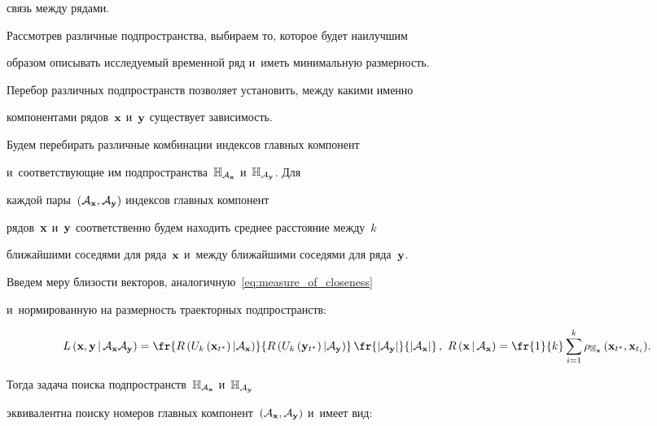 связь между рядами.



Рассмотрев различные подпространства, выбираем то, которое будет наилучшим 

образом описывать исследуемый временной ряд и~иметь минимальную размерность.  

Перебор различных подпространств позволяет установить, между какими именно 

компонентами рядов~$\mathbf{x}$ и~$\mathbf{y}$ существует зависимость.



Будем перебирать различные комбинации индексов главных компонент 

и~соответствующие им подпространства~$\mathbb{H}_{\mathcal{A}_{\mathbf{x}}}$ и~$\mathbb{H}_{\mathcal{A}_{\mathbf{y}}}$. Для 

каждой пары~$\left({\mathcal{A}}_{\mathbf{x}}, {\mathcal{A}}_{\mathbf{y}}\right)$ индексов главных компонент 

рядов~$\mathbf{x}$ и~$\mathbf{y}$ соответственно будем находить среднее расстояние между~$k$ 

ближайшими соседями для ряда~$\mathbf{x}$ и~между ближайшими соседями для ряда~$\mathbf{y}$. 

Введем меру близости векторов, аналогичную~\eqref{eq:measure_of_closeness} 

и~нормированную на размерность траекторных подпространств:

\begin{equation}

L\left(\bx, \by \,|\, {\cA}_{\bx} {\cA}_{\by}\right) =

\fr{R\left(U_k\left(\bx_{t^*}\right) \vert 

{\cA}_{\bx}\right)}{R\left(U_k\left(\by_{t^*}\right) \vert {\cA}_{\by}\right)} 

\, \fr{|{\cA}_{\by}|}{|{\cA}_{\bx}|}\,, \

R\left(\bx\,|\, {\cA}_{\bx}\right) = \fr{1}{k}\sum\limits_{i = 1}^{k}

{\rho_{\mathbb{H}_{\bx}} 

\left( \bx_{t^*}, \bx_{t_i} \right)}.\!

\label{eq:Sxy}

\end{equation}

%

Тогда задача поиска подпространств~$\mathbb{H}_{\mathcal{A}_{\mathbf{x}}}$ и~$\mathbb{H}_{\mathcal{A}_{\mathbf{y}}}$ 

эквивалентна поиску номеров главных компонент~$\left(\cA_{\bx}, \cA_{\by} 

\right)$ и~имеет вид:

